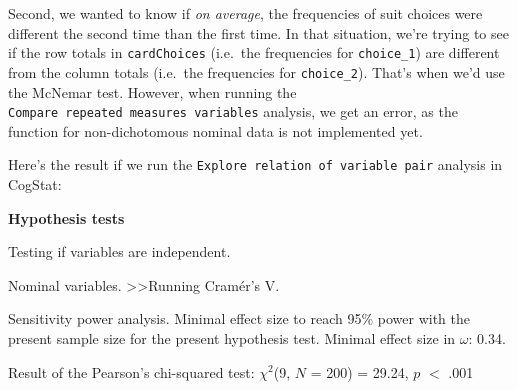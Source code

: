 \documentclass[
]{book}
\theoremstyle{definition}
\theoremstyle{definition}
\theoremstyle{definition}
\theoremstyle{definition}
\theoremstyle{remark}
\begin{document}
Second, we wanted to know if \emph{on average}, the frequencies of suit choices were different the second time than the first time. In that situation, we're trying to see if the row totals in \texttt{cardChoices} (i.e.~the frequencies for \texttt{choice\_1}) are different from the column totals (i.e.~the frequencies for \texttt{choice\_2}). That's when we'd use the McNemar test. However, when running the \texttt{Compare\ repeated\ measures\ variables} analysis, we get an error, as the function for non-dichotomous nominal data is not implemented yet.

Here's the result if we run the \texttt{Explore\ relation\ of\ variable\ pair} analysis in CogStat:

\begin{tcolorbox}[colback=white,
  colframe=lightgray,
  coltext=black,
  boxsep=4pt,
  boxrule=0.3pt,
  arc=0pt]
  {   \sffamily
      \color{CSblue}\textbf{Hypothesis tests}
      
      \color{CSgreen}Testing if variables are independent.
      
      Nominal variables.  \textgreater\textgreater  Running Cramér's V.
      
      \color{black}
      Sensitivity power analysis. Minimal effect size to reach 95\% power with the present sample size for the present hypothesis test. Minimal effect size in $\omega$: 0.34.
      
      Result of the Pearson's  chi-squared test: $\chi^2$(9, $N$ = 200) = 29.24, $p$ $<$ .001
      \normalfont
  }
\end{tcolorbox}
\end{document}
